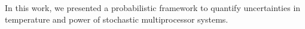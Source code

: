 In this work, we presented a probabilistic framework to quantify uncertainties in temperature and power of stochastic multiprocessor systems.
